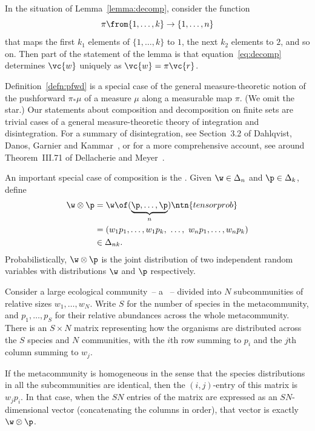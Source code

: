 In the situation of Lemma~\ref{lemma:decomp}, consider the function
\[
\pi \from \{1, \ldots, k\} \to \{1, \ldots, n\}
\]
that maps the first $k_1$ elements of $\{1, \ldots, k\}$ to $1$, the next
$k_2$ elements to $2$, and so on.  Then part of the statement of the lemma
is that equation~\eqref{eq:decomp} determines $\vc{w}$ uniquely as $\vc{w}
= \pi\vc{r}$.

\begin{remark}
Definition~\ref{defn:pfwd} is a special case of the general
measure-theoretic notion of the pushforward $\pi_*\mu$ of a measure $\mu$
along a measurable map $\pi$.  (We omit the star.)  Our statements
about composition and decomposition on finite sets are trivial cases of a
general measure-theoretic theory of integration and
disintegration.   For a
summary of disintegration, see Section~3.2 of Dahlqvist, Danos, Garnier and
Kammar~\cite{DDGK}, or for a more comprehensive account, see around
Theorem~III.71 of Dellacherie and Meyer~\cite{DeMe}.
\end{remark}

An important special case of composition is the 
.  Given $\w \in \Delta_n$ and $\p \in \Delta_k$, define
% 
\begin{align*}
\w \otimes \p   &
=
\w \of (\underbrace{\p, \ldots, \p}_n)  
\ntn{tensorprob}        \\
&
=
(w_1 p_1, \ldots, w_1 p_k, 
\ \ldots, \ 
w_n p_1, \ldots, w_n p_k)       \\
&
\in
\Delta_{nk}.
\end{align*}
% 
Probabilistically, $\w \otimes \p$ is the joint distribution of two
independent random variables with distributions $\w$ and $\p$
respectively. 

\begin{example}
Consider a large ecological community~-- a
~-- divided into $N$
subcommunities of relative sizes $w_1, \ldots, w_N$.  Write $S$ for the
number of species in the metacommunity, and $p_1, \ldots, p_S$ for their
relative abundances across the whole metacommunity.  There is an $S \times
N$ matrix representing how the organisms are distributed across the $S$
species and $N$ communities, with the $i$th row summing to $p_i$ and the
$j$th column summing to $w_j$.

If the metacommunity is homogeneous in the sense that the species
distributions in all the subcommunities are identical, then the $(i,
j)$-entry of this matrix is $w_j p_i$.  In that case, when the $SN$ entries
of the matrix are expressed as an $SN$-dimensional vector
(concatenating the columns in order), that
vector is exactly $\w \otimes \p$.
\end{example}

